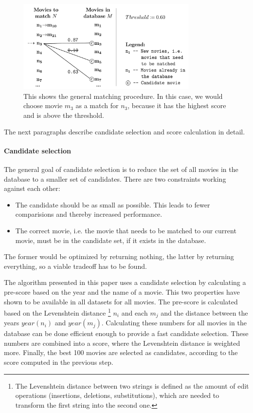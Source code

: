 \begin{figure}[ht]
  \begin{center}
  \includegraphics[width=0.8\textwidth]{images/matching_general.pdf}
  \end{center}
  \caption{This shows the general matching procedure. In this case, we would choose movie $m_3$ as a match for $n_3$, because it has the highest score and is above the threshold.}
  \label{fig_matching_general}
\end{figure}

The next paragraphs describe candidate selection and score calculation in detail.

\paragraph{Candidate selection}

The general goal of candidate selection is to reduce the set of all movies in the database to a smaller set of candidates.
There are two constraints working against each other:
\begin{itemize}
	\item The candidate should be as small as possible. This leads to fewer comparisions and thereby increased performance.
	\item The correct movie, i.e. the movie that needs to be matched to our current movie, must be in the candidate set, if it exists in the database.
\end{itemize}
The former would be optimized by returning nothing, the latter by returning everything, so a viable tradeoff has to be found.

The algorithm presented in this paper uses a candidate selection by calculating a pre-score based on the year and the name of a movie.
This two properties have shown to be available in all datasets for all movies.
The pre-score is calculated based on the Levenshtein distance \footnote{The Levenshtein distance between two strings is defined as the amount of edit operations (insertions, deletions, substitutions), which are needed to transform the first string into the second one.} $n_i$ and each $m_j$ and the distance between the years $year(n_i)$ and $year(m_j)$.
Calculating these numbers for all movies in the database can be done efficient enough to provide a fast candidate selection.
These numbers are combined into a score, where the Levenshtein distance is weighted more.
Finally, the best 100 movies are selected as candidates, according to the score computed in the previous step.

